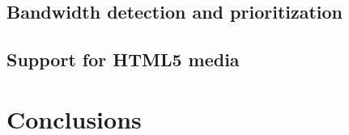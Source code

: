 \documentclass[letterpaper,twocolumn,10pt]{article}
\begin{document}

\subsection{Bandwidth detection and prioritization}


\subsection{Support for HTML5 media}



\section{Conclusions}



{\footnotesize 
}
\end{document}
